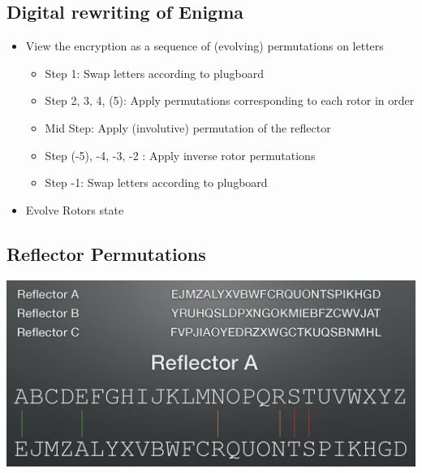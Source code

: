 		\subsection{Digital rewriting of Enigma}
			\begin{itemize}
				\item View the encryption as a sequence of (evolving) permutations on letters
				\begin{itemize}
					\item Step 1: Swap letters according to plugboard
					\item Step 2, 3, 4, (5): Apply permutations corresponding to each rotor in order
					\item Mid Step: Apply (involutive) permutation of the reflector
					\item Step (-5), -4, -3, -2 : Apply inverse rotor permutations
					\item Step -1: Swap letters according to plugboard
				\end{itemize}
				\item Evolve Rotors state
			\end{itemize}

		\subsection{Reflector Permutations}
			\begin{center}
         		\includegraphics[width=180mm]{Graphics/Historical Ciphers/Enigma2.png}\newline
       		\end{center}
       	
